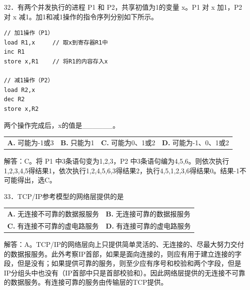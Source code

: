 \documentclass[UTF8,11pt]{ctexart}
\begin{document}
32．有两个并发执行的进程 P1 和 P2，共享初值为1的变量 x。P1 对 x 加1，P2 对 x 减1。加1和减1操作的指令序列分别如下所示。


\begin{Verbatim}[breaklines,breakanywhere,fontsize=\small]
// 加1操作（P1）
load R1,x     // 取x到寄存器R1中
inc R1
store x,R1    // 将R1的内容存入x

// 减1操作（P2）
load R2,x
dec R2
store x,R2
\end{Verbatim}

两个操作完成后，x的值是\_\_\_\_\_\_。


\begin{center}\begin{tabular}{>{\raggedright\arraybackslash}p{\dimexpr(\linewidth-8\tabcolsep)/4\relax}>{\raggedright\arraybackslash}p{\dimexpr(\linewidth-8\tabcolsep)/4\relax}>{\raggedright\arraybackslash}p{\dimexpr(\linewidth-8\tabcolsep)/4\relax}>{\raggedright\arraybackslash}p{\dimexpr(\linewidth-8\tabcolsep)/4\relax}}
\textbf{A.} 可能为-1或3 & \textbf{B.} 只能为1 & \textbf{C.} 可能为0、1或2 & \textbf{D.} 可能为-1、0、1或2\\[.35em]\end{tabular}\end{center}

解答：C。将 P1 中3条语句变为1,2,3，P2 中3条语句编为4,5,6。则依次执行1,2,3,4,5得结果1，依次执行1,2,4,5,6,3得结果2，执行4,5,1,2,3,6得结果0。结果-1不可能得出，选C。


33．TCP/IP参考模型的网络层提供的是


\begin{center}\begin{tabular}{>{\raggedright\arraybackslash}p{\dimexpr(\linewidth-4\tabcolsep)/2\relax}>{\raggedright\arraybackslash}p{\dimexpr(\linewidth-4\tabcolsep)/2\relax}}
\textbf{A.} 无连接不可靠的数据报服务 & \textbf{B.} 无连接可靠的数据报服务\\[.35em]
\textbf{C.} 有连接不可靠的虚电路服务 & \textbf{D.} 有连接可靠的虚电路服务\\[.35em]\end{tabular}\end{center}

解答：A。TCP/IP的网络层向上只提供简单灵活的、无连接的、尽最大努力交付的数据报服务。此外考察IP首部，如果是面向连接的，则应有用于建立连接的字段，但是没有；如果提供可靠的服务，则至少应有序号和校验和两个字段，但是IP分组头中也没有（IP首部中只是首部校验和）。因此网络层提供的无连接不可靠的数据服务。有连接可靠的服务由传输层的TCP提供。
\end{document}
